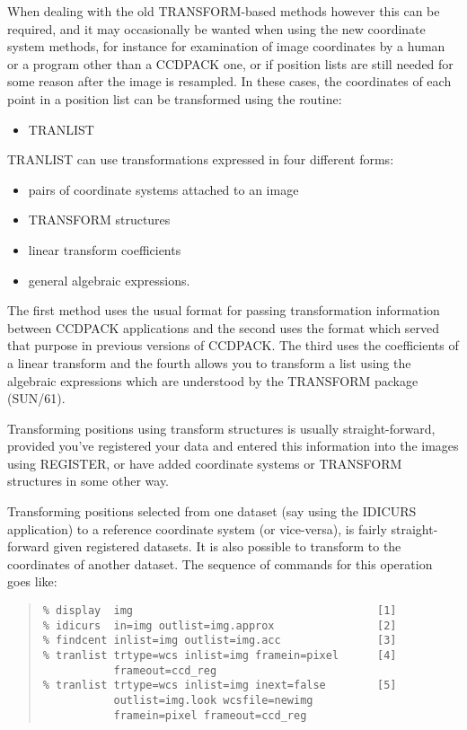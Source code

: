 \documentclass[twoside,11pt]{article}
\newcommand{\htmlref}[2]{#1}
\newcommand{\xref}[3]{#1}
\renewcommand{\_}{\texttt{\symbol{95}}}
\newenvironment{myquote}{\begin{quote}\begin{small}}{\end{small}\end{quote}}
\newcommand{\routine}[1]{{\sc #1}}
\newcommand{\xroutine}[1]{\htmlref{{\sc #1}}{#1}}
\begin{document}
When dealing with the old TRANSFORM-based methods however this can be required,
and it may occasionally be wanted when using the new coordinate system
methods, for instance for examination of image coordinates by
a human or a program other than a CCDPACK one, or if 
position lists are still needed for some reason after the
image is resampled.
In these cases, the coordinates of each point in a position 
list can be transformed using the routine:
\begin{itemize}
\item \xroutine{TRANLIST}
\end{itemize}
\routine{TRANLIST} can use transformations expressed in four different forms:
\begin{itemize}
\item pairs of coordinate systems attached to an image
\item TRANSFORM structures
\item linear transform coefficients
\item general algebraic expressions.
\end{itemize}
The first method uses the usual format for passing transformation
information between CCDPACK applications 
and the second uses the format which served 
that purpose in previous versions of CCDPACK.
The third uses the coefficients of a linear transform and the fourth
allows you to transform a list using the algebraic expressions which are
understood by the \xref{TRANSFORM package (SUN/61)}{sun61}{}.

Transforming positions using transform structures is usually
straight-forward, provided you've registered your data and 
entered this information into the images using \xroutine{REGISTER},
or have added coordinate systems or TRANSFORM structures in some other way.

Transforming positions selected from one dataset 
(say using the \xroutine{IDICURS}
application) to a reference coordinate system (or vice-versa), is
fairly straight-forward given registered datasets. It is also possible
to transform to the coordinates of another dataset. The sequence of
commands for this operation goes like:
\begin{myquote}
\begin{verbatim}
% display  img                                      [1]
% idicurs  in=img outlist=img.approx                [2]
% findcent inlist=img outlist=img.acc               [3]
% tranlist trtype=wcs inlist=img framein=pixel      [4]
           frameout=ccd_reg
% tranlist trtype=wcs inlist=img inext=false        [5]
           outlist=img.look wcsfile=newimg
           framein=pixel frameout=ccd_reg
\end{verbatim}
\end{myquote}
\end{document}
